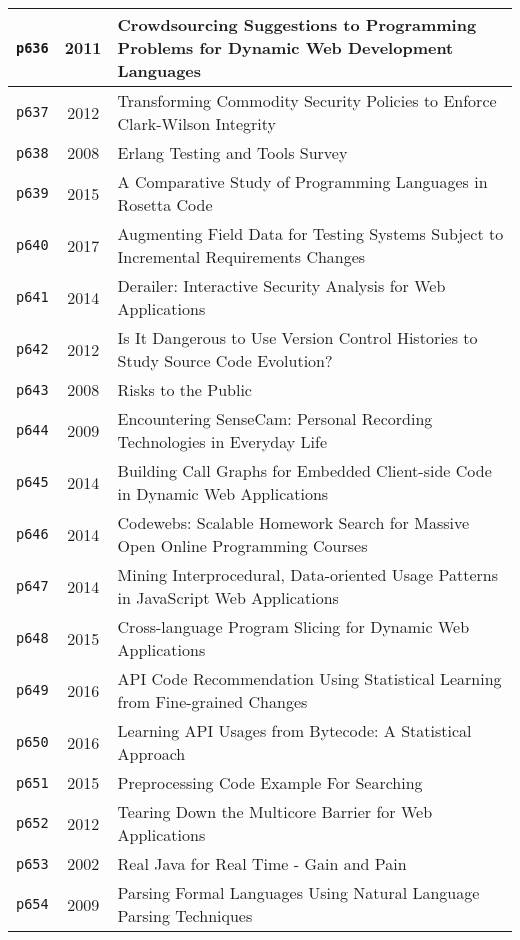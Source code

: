 \begin{longtable}{| c | c | p{16cm} |}
  \hline
  \texttt{p636} & 2011 & Crowdsourcing Suggestions to Programming Problems for Dynamic Web Development Languages \\
  \hline
  \texttt{p637} & 2012 & Transforming Commodity Security Policies to Enforce Clark-Wilson Integrity \\
  \hline
  \texttt{p638} & 2008 & Erlang Testing and Tools Survey \\
  \hline
  \texttt{p639} & 2015 & A Comparative Study of Programming Languages in Rosetta Code \\
  \hline
  \texttt{p640} & 2017 & Augmenting Field Data for Testing Systems Subject to Incremental Requirements Changes \\
  \hline
  \texttt{p641} & 2014 & Derailer: Interactive Security Analysis for Web Applications \\
  \hline
  \texttt{p642} & 2012 & Is It Dangerous to Use Version Control Histories to Study Source Code Evolution? \\
  \hline
  \texttt{p643} & 2008 & Risks to the Public \\
  \hline
  \texttt{p644} & 2009 & Encountering SenseCam: Personal Recording Technologies in Everyday Life \\
  \hline
  \texttt{p645} & 2014 & Building Call Graphs for Embedded Client-side Code in Dynamic Web Applications \\
  \hline
  \texttt{p646} & 2014 & Codewebs: Scalable Homework Search for Massive Open Online Programming Courses \\
  \hline
  \texttt{p647} & 2014 & Mining Interprocedural, Data-oriented Usage Patterns in JavaScript Web Applications \\
  \hline
  \texttt{p648} & 2015 & Cross-language Program Slicing for Dynamic Web Applications \\
  \hline
  \texttt{p649} & 2016 & API Code Recommendation Using Statistical Learning from Fine-grained Changes \\
  \hline
  \texttt{p650} & 2016 & Learning API Usages from Bytecode: A Statistical Approach \\
  \hline
  \texttt{p651} & 2015 & Preprocessing Code Example For Searching \\
  \hline
  \texttt{p652} & 2012 & Tearing Down the Multicore Barrier for Web Applications \\
  \hline
  \texttt{p653} & 2002 & Real Java for Real Time - Gain and Pain \\
  \hline
  \texttt{p654} & 2009 & Parsing Formal Languages Using Natural Language Parsing Techniques \\

\end{longtable}
